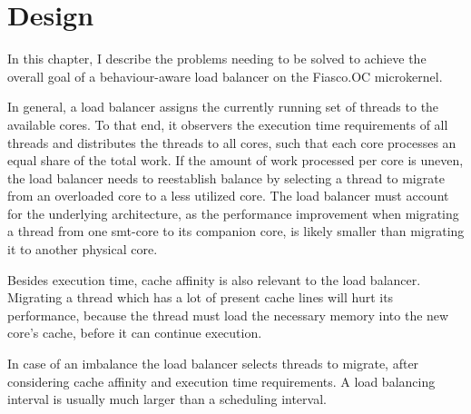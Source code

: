 \chapter{Design}
\label{sec:design}




In this chapter, I describe the problems needing to be solved to achieve the
overall goal of a behaviour-aware load balancer on the Fiasco.OC microkernel.

In general, a load balancer assigns the currently running set of threads to the
available cores.
To that end, it observers the execution time requirements of all threads and
distributes the threads to all cores, such that each core processes an equal
share of the total work.
If the amount of work processed per core is uneven, the load balancer
needs to reestablish balance by selecting a thread to migrate from an
overloaded core to a less utilized core.
The load balancer must account for the underlying architecture, as
the performance improvement when migrating a thread from one \gls{smt}-core to
its companion core, is likely smaller than migrating it to another physical core.

Besides execution time, cache affinity is also relevant to the load balancer.
Migrating a thread which has a lot of present cache lines will hurt its
performance, because the thread must load the necessary memory into the new
core's cache, before it can continue execution.

In case of an imbalance the load balancer selects threads to migrate, after
considering cache affinity and execution time requirements.
A load balancing interval is usually much larger than a scheduling interval.

